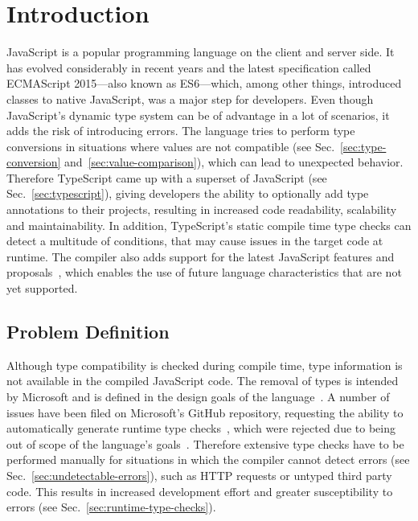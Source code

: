 \chapter{Introduction}
\label{cha:introduction}

JavaScript is a popular programming language on the client and server side. It has evolved considerably in recent years and the latest specification called ECMAScript 2015---also known as ES6---which, among other things, introduced classes to native JavaScript, was a major step for developers. Even though JavaScript's dynamic type system can be of advantage in a lot of scenarios, it adds the risk of introducing errors. The language tries to perform type conversions in situations where values are not compatible (see Sec.~\ref{sec:type-conversion} and~\ref{sec:value-comparison}), which can lead to unexpected behavior. Therefore TypeScript came up with a superset of JavaScript (see Sec.~\ref{sec:typescript}), giving developers the ability to optionally add type annotations to their projects, resulting in increased code readability, scalability and maintainability. In addition, TypeScript's static compile time type checks can detect a multitude of conditions, that may cause issues in the target code at runtime. The compiler also adds support for the latest JavaScript features and proposals~\cites{TypeScriptHandbook:CompilerOptions, TypeScriptWebsite}, which enables the use of future language characteristics that are not yet supported.

\section{Problem Definition}
\label{sec:problem-definition}

Although type compatibility is checked during compile time, type information is not available in the compiled JavaScript code. The removal of types is intended by Microsoft and is defined in the design goals of the language~\cite{TypeScriptWiki:DesignGoals}. A number of issues have been filed on Microsoft's GitHub repository, requesting the ability to automatically generate runtime type checks~\cites{TypeScriptIssue:RuntimeTypeChecking, TypeScriptIssue:RuntimeTypeChecks, TypeScriptIssue:EmitTypeArguments}, which were rejected due to being out of scope of the language's goals~\cites{TypeScriptIssue:RuntimeTypeChecking:Comment:OutOfScope, TypeScriptIssue:EmitTypeArguments:Comment:OutOfScope}. Therefore extensive type checks have to be performed manually for situations in which the compiler cannot detect errors (see Sec.~\ref{sec:undetectable-errors}), such as HTTP requests or untyped third party code. This results in increased development effort and greater susceptibility to errors (see Sec.~\ref{sec:runtime-type-checks}).

